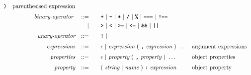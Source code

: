 \begin{alignat*}{9}
                                            \textbf{\texttt{)}} && \textrm{parenthesised expression}\\[1mm]
&& \textit{binary-operator}    \ 
                        && ::= &\quad && \textbf{\texttt{+}}\ |\ \textbf{\texttt{-}}\ |\ \textbf{\texttt{*}}\ |\ \textbf{\texttt{/}}\ |\ \textbf{\texttt{\%}}\ |\ 
                                   \textbf{\texttt{===}}\ |\ \textbf{\texttt{!==}}\ \\
&&                       && |  &\quad &&  \texttt{\textbf{>}}\ |\ \texttt{\textbf{<}}\ |\ \texttt{\textbf{>=}}\ |\ \texttt{\textbf{<=}}\
                                          |\ \textbf{\texttt{\&\&}}\ |\ \texttt{\textbf{||}}\  \\[1mm]
&& \textit{unary-operator}    
                        && ::= &\quad && \textbf{\texttt{!}}\ |\ \textbf{\texttt{-}}\\[1mm]
&& \textit{expressions}  && ::= &\quad && \epsilon\ | \ \textit{expression}\ (
                                                               \ \textbf{\texttt{,}} \
                                                                 \textit{expression} \ 
                                                                      )\ \ldots
                                                            && \textrm{argument expressions} \\[1mm]
&& \textit{properties}  && ::= &\quad && \epsilon\ | \ \textit{property}\ (
                                                               \ \textbf{\texttt{,}} \
                                                                 \textit{property} \ 
                                                                      )\ \ldots
                                                            && \textrm{object properties} \\[1mm]
&& \textit{property}  && ::= &\quad && (\ \textit{string}\ |\ \textit{name}\ ) 
                                        \ \textbf{\texttt{:}} \ \textit{expression} 
                                                            && \textrm{object property}
\end{alignat*}

\newpage













